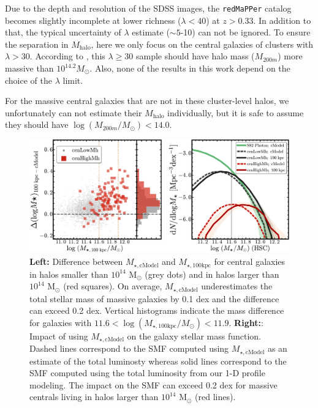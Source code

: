\documentclass{emulateapj}
\def\redm{\texttt{redMaPPer}}
\def\mhalo{{$M_{\mathrm{halo}}$}}
\def\mtot{{$M_{\star,100\mathrm{kpc}}$}}
\def\mcmodel{{$M_{\star,\mathrm{cModel}}$}}
\def\logmtot{{$\log (M_{\star,100\mathrm{kpc}}/M_{\odot})$}}
\begin{document}
\begin{CJK*}{UTF8}{gbsn}
    Due to the depth and resolution of the SDSS images, the \redm{} catalog 
    becomes slightly incomplete at lower richness ($\lambda < 40$) at $z > 0.33$. 
    In addition to that, the typical uncertainty of $\lambda$ estimate ($\sim 5$-10) 
    can not be ignored. 
    To ensure the separation in \mhalo{}, here we only focus on the central galaxies of
    clusters with $\lambda > 30$. 
    According to \citet{Simet2016}, this $\lambda \geq 30$ sample should have halo mass
    ($M_{200m}$) more massive than $10^{14.2} M_{\odot}$. 
    Also, none of the results in this work depend on the choice of the $\lambda$ 
    limit.
    
    For the massive central galaxies that are not in these cluster-level halos, 
    we unfortunately can not estimate their \mhalo{} individually, but it is safe 
    to assume they should have $\log (M_{200m}/M_{\odot}) < 14.0$.     
 

  \begin{figure}[bt!]
      \centering 
      \includegraphics[width=\textwidth]{fig/redbcg_smf_new}
      \caption{\textbf{Left:} Difference between \mcmodel{} and \mtot{} for central
      	galaxies in halos smaller than $10^{14}$ M$_{\odot}$ (grey dots) and in
        halos larger than $10^{14}$ M$_{\odot}$ (red squares). 
        On average, \mcmodel{} underestimates the total stellar mass of massive 
        galaxies by 0.1 dex and the difference can exceed 0.2 dex. 
        Vertical histograms indicate the mass difference for galaxies with
        $11.6<$\logmtot{}$<11.9$. 
        \textbf{Right:}: Impact of using \mcmodel{} on the galaxy stellar mass
        function. 
        Dashed lines correspond to the SMF computed using \mcmodel{} as an estimate
        of the total luminosty whereas solid lines correspond to the SMF computed
        using the total luminosity from our 1-D profile modeling. 
        The impact on the SMF can exceed 0.2 dex for massive centrals living in
        halos larger than $10^{14}$ M$_{\odot}$ (red lines).}
      \label{fig:smf1}
  \end{figure}
          

\end{CJK*}
\end{document}

